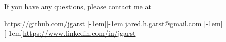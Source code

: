 \documentclass[11pt,a4paper]{article}
\newcommand*\sbull{\raisebox{-0.550ex}[-1em][-1em]{\textscale{4}{\( \cdot \)}}\xspace}
\begin{document}
\vfill

\begin{center}
    If you have any questions, please contact me at
\end{center}

\begin{center}
    \href{https://github.com/jgarst}{https://github.com/jgarst} \sbull \href{jared.h.garst@gmail.com}{jared.h.garst@gmail.com} \sbull \href{https://www.linkedin.com/in/jgarst}{https://www.linkedin.com/in/jgarst}

\end{center}
\end{document}
